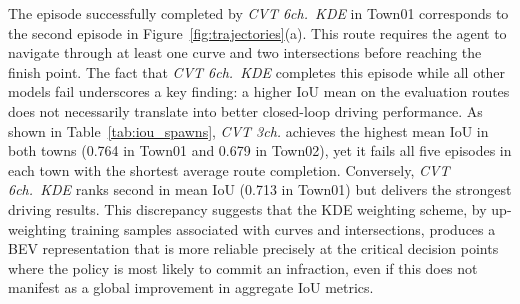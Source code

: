 \documentclass[12pt]{article}
\begin{document}
The episode successfully completed by \textit{CVT 6ch.\ KDE} in Town01 corresponds to the second episode in Figure~\ref{fig:trajectories}(a). This route requires the agent to navigate through at least one curve and two intersections before reaching the finish point. The fact that \textit{CVT 6ch.\ KDE} completes this episode while all other models fail underscores a key finding: a higher IoU mean on the evaluation routes does not necessarily translate into better closed-loop driving performance. As shown in Table~\ref{tab:iou_spawns}, \textit{CVT 3ch.} achieves the highest mean IoU in both towns (0.764 in Town01 and 0.679 in Town02), yet it fails all five episodes in each town with the shortest average route completion. Conversely, \textit{CVT 6ch.\ KDE} ranks second in mean IoU (0.713 in Town01) but delivers the strongest driving results. This discrepancy suggests that the KDE weighting scheme, by up-weighting training samples associated with curves and intersections, produces a BEV representation that is more reliable precisely at the critical decision points where the policy is most likely to commit an infraction, even if this does not manifest as a global improvement in aggregate IoU metrics.

\begin{table}[ht]
\centering
\caption{Mean IoU per channel on the spawn evaluation for Town01 and Town02.
Channels: Road (ch.\,0), Route (ch.\,1), Lane boundary (ch.\,2).}
\label{tab:iou_spawns}
\end{table}
\end{document}
